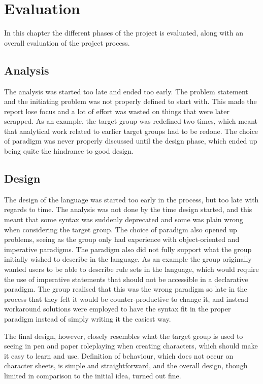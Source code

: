 \chapter{Evaluation}
In this chapter the different phases of the project is evaluated, along with an overall evaluation of the project process.

\section{Analysis}
The analysis was started too late and ended too early. The problem statement and the initiating problem was not properly defined to start with. This made the report lose focus and a lot of effort was wasted on things that were later scrapped. As an example, the target group was redefined two times, which meant that analytical work related to earlier target groups had to be redone.
The choice of paradigm was never properly discussed until the design phase, which ended up being quite the hindrance to good design.

\section{Design}
The design of the language was started too early in the process, but too late with regards to time. The analysis was not done by the time design started, and this meant that some syntax was suddenly deprecated and some was plain wrong when considering the target group. The choice of paradigm also opened up problems, seeing as the group only had experience with object-oriented and imperative paradigms. The paradigm also did not fully support what the group initially wished to describe in the language. As an example the group originally wanted users to be able to describe rule sets in the language, which would require the use of imperative statements that should not be accessible in a declarative paradigm. The group realised that this was the wrong paradigm so late in the process that they felt it would be counter-productive to change it, and instead workaround solutions were employed to have the syntax fit in the proper paradigm instead of simply writing it the easiest way.

The final design, however, closely resembles what the target group is used to seeing in pen and paper roleplaying when creating characters, which should make it easy to learn and use. Definition of behaviour, which does not occur on character sheets, is simple and straightforward, and the overall design, though limited in comparison to the initial idea, turned out fine.


